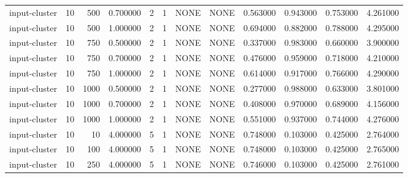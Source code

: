 \begin{tabular}{lrrrllllrrrr}
input-cluster & 10 & 500 & 0.700000 & 2 & 1 & NONE & NONE & 0.563000 & 0.943000 & 0.753000 & 4.261000 \\
input-cluster & 10 & 500 & 1.000000 & 2 & 1 & NONE & NONE & 0.694000 & 0.882000 & 0.788000 & 4.295000 \\
input-cluster & 10 & 750 & 0.500000 & 2 & 1 & NONE & NONE & 0.337000 & 0.983000 & 0.660000 & 3.900000 \\
input-cluster & 10 & 750 & 0.700000 & 2 & 1 & NONE & NONE & 0.476000 & 0.959000 & 0.718000 & 4.210000 \\
input-cluster & 10 & 750 & 1.000000 & 2 & 1 & NONE & NONE & 0.614000 & 0.917000 & 0.766000 & 4.290000 \\
input-cluster & 10 & 1000 & 0.500000 & 2 & 1 & NONE & NONE & 0.277000 & 0.988000 & 0.633000 & 3.801000 \\
input-cluster & 10 & 1000 & 0.700000 & 2 & 1 & NONE & NONE & 0.408000 & 0.970000 & 0.689000 & 4.156000 \\
input-cluster & 10 & 1000 & 1.000000 & 2 & 1 & NONE & NONE & 0.551000 & 0.937000 & 0.744000 & 4.276000 \\
input-cluster & 10 & 10 & 4.000000 & 5 & 1 & NONE & NONE & 0.748000 & 0.103000 & 0.425000 & 2.764000 \\
input-cluster & 10 & 100 & 4.000000 & 5 & 1 & NONE & NONE & 0.748000 & 0.103000 & 0.425000 & 2.765000 \\
input-cluster & 10 & 250 & 4.000000 & 5 & 1 & NONE & NONE & 0.746000 & 0.103000 & 0.425000 & 2.761000 \\
\bottomrule
\end{tabular}
